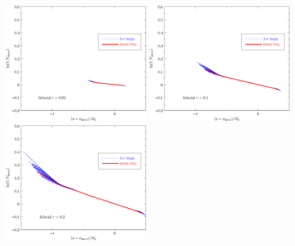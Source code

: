 \documentclass[11pt]{article}
\def \halffigwidth{0.48\textwidth}
\begin{document}
\begin{figure}
  \includegraphics[width=\halffigwidth]{nobicep_spline0_p11_r0d02_potential_traj.pdf}%
  \includegraphics[width=\halffigwidth]{nobicep_spline0_p11_r0d1_potential_traj.pdf} 
  \includegraphics[width=\halffigwidth]{nobicep_spline0_p11_r0d2_potential_traj.pdf}

\end{figure}
\end{document}
